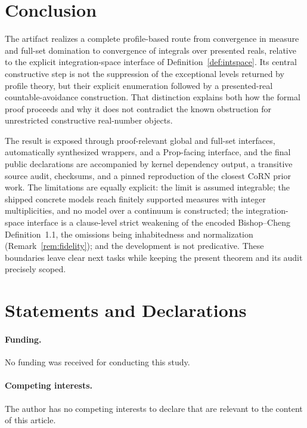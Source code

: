 \documentclass[11pt]{article}
\theoremstyle{definition}
\theoremstyle{remark}
\begin{document}
\section{Conclusion}
\label{sec:conclusion}

The artifact realizes a complete profile-based route from convergence in measure and full-set domination to convergence of integrals over presented reals, relative to the explicit integration-space interface of Definition~\ref{def:intspace}.  Its central constructive step is not the suppression of the exceptional levels returned by profile theory, but their explicit enumeration followed by a presented-real countable-avoidance construction.  That distinction explains both how the formal proof proceeds and why it does not contradict the known obstruction for unrestricted constructive real-number objects.

The result is exposed through proof-relevant global and full-set interfaces, automatically synthesized wrappers, and a Prop-facing interface, and the final public declarations are accompanied by kernel dependency output, a transitive source audit, checksums, and a pinned reproduction of the closest CoRN prior work.  The limitations are equally explicit: the limit is assumed integrable; the shipped concrete models reach finitely supported measures with integer multiplicities, and no model over a continuum is constructed; the integration-space interface is a clause-level strict weakening of the encoded Bishop--Cheng Definition~1.1, the omissions being inhabitedness and normalization (Remark~\ref{rem:fidelity}); and the development is not predicative.  These boundaries leave clear next tasks while keeping the present theorem and its audit precisely scoped.

\section*{Statements and Declarations}

\paragraph{Funding.}  No funding was received for conducting this study.

\paragraph{Competing interests.}  The author has no competing interests to declare
that are relevant to the content of this article.
\end{document}
